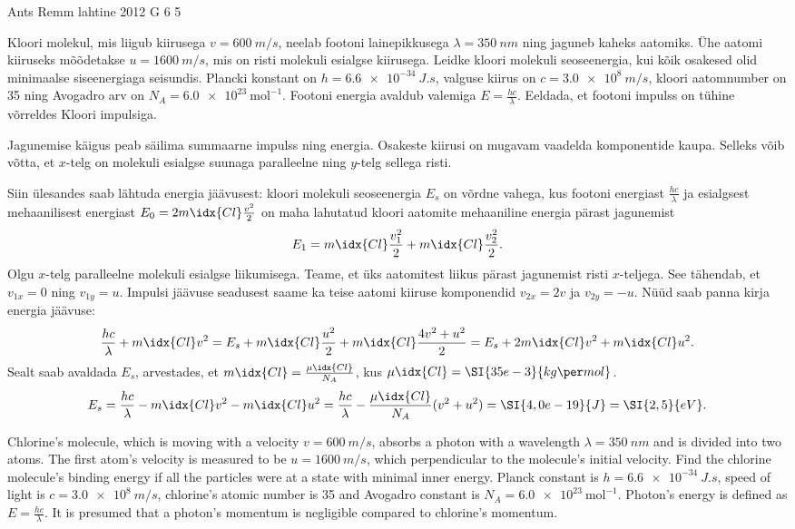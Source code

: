 {Ants Remm} %
{lahtine} %
{2012} %
{G 6} %
{5} %
{
\ifStatement
Kloori molekul, mis liigub kiirusega $v = \SI{600}{m/s}$, neelab
footoni lainepikkusega $\lambda = \SI{350}{nm}$ ning jaguneb kaheks aatomiks.
Ühe aatomi kiiruseks
mõõdetakse $ u = \SI{1600}{m/s}$, mis on risti molekuli esialgse
kiirusega. Leidke kloori molekuli seoseenergia, kui kõik osakesed olid
minimaalse siseenergiaga seisundis. Plancki konstant on $h =
\SI{6,6e-34}{J.s}$, valguse kiirus on $c = \SI{3,0e8}{m/s}$, kloori aatomnumber on 35 ning Avogadro arv on $N_A
= \SI{6,0e23}{\text{mol}^{-1}}$. Footoni energia avaldub valemiga $E =
\frac{h c}{\lambda}$. Eeldada, et footoni impulss on tühine võrreldes Kloori impulsiga.
\fi


\ifHint
Jagunemise käigus peab säilima summaarne impulss ning energia. Osakeste kiirusi on mugavam vaadelda komponentide kaupa. Selleks võib võtta, et $x$-telg on molekuli esialgse suunaga paralleelne ning $y$-telg sellega risti.
\fi


\ifSolution
Siin ülesandes saab lähtuda energia jäävusest: kloori molekuli seoseenergia $E_s$ on võrdne vahega, kus footoni energiast $\frac{hc}{\lambda}$ ja esialgsest mehaanilisest energiast $E_0 = 2m\idx{Cl} \frac{v^2}{2} $ on maha lahutatud kloori aatomite mehaaniline energia pärast jagunemist
\[
E_1 = m\idx{Cl} \frac{v_1^2}{2} + m\idx{Cl} \frac{v_2^2}{2}.
\]
Olgu $x$-telg paralleelne molekuli esialgse liikumisega. Teame, et üks aatomitest liikus pärast jagunemist risti $x$-teljega. See tähendab, et $v_{1x} = 0$ ning $v_{1y} = u$. Impulsi jäävuse seadusest saame ka teise aatomi kiiruse komponendid $v_{2x} = 2 v$ ja $v_{2y} = -u$. Nüüd saab panna kirja energia jäävuse:
$$
	\frac{hc}{\lambda} + m\idx{Cl} v^2 = E_s + m\idx{Cl} \frac{u^2}{2} + m\idx{Cl} \frac{4v^2 + u^2}{2} = E_s + 2 m\idx{Cl} v^2 + m\idx{Cl} u^2.
$$
Sealt saab avaldada $E_s$, arvestades, et $m\idx{Cl} = \frac{\mu\idx{Cl}}{N_A}$, kus $\mu\idx{Cl} = \SI{35e-3}{kg\per mol}$.
$$ E_s = \frac{hc}{\lambda} - m\idx{Cl} v^2 - m\idx{Cl} u^2 = \frac{hc}{\lambda} - \frac{\mu\idx{Cl}}{N_A} (v^2 + u^2) = \SI{4,0e-19}{J} = \SI{2,5}{eV}.
$$
\fi


\ifEngStatement
Chlorine’s molecule, which is moving with a velocity $v = \SI{600}{m/s}$, absorbs a photon with a wavelength $\lambda = \SI{350}{nm}$ and is divided into two atoms. The first atom’s velocity is measured to be $ u = \SI{1600}{m/s}$, which perpendicular to the molecule’s initial velocity. Find the chlorine molecule’s binding energy if all the particles were at a state with minimal inner energy. Planck constant is $h =
\SI{6,6e-34}{J.s}$, speed of light is $c = \SI{3,0e8}{m/s}$, chlorine’s atomic number is 35 and Avogadro constant is $N_A
= \SI{6,0e23}{\text{mol}^{-1}}$. Photon’s energy is defined as $E =
\frac{h c}{\lambda}$. It is presumed that a photon’s momentum is negligible compared to chlorine’s momentum.
\fi


}
